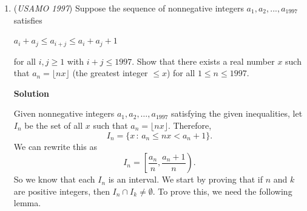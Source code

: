 \begin{enumerate}
 $\textbf{WARNING:}$

 This solution doesn’t work because $(x+y+z)\left(\frac{1}{x}+\frac{1}{y}+\frac{1}{z}\right)\geq 9$, so $\frac{1}{x}+\frac{1}{y}+\frac{1}{z}\geq \frac{9}{x+y+z}$




\textbf{Solution 3}

If we multiply each side by $abc$, we get that we must just prove that 
 \[\frac{abc}{a^3+b^3+abc} + \frac{abc}{b^3+c^3+abc} + \frac{abc}{c^3+a^3+abc} \leq 1\] If we divide our LHS equation, we get that 
 \[\frac{1}{\frac{a^3+b^3+abc}{abc}} +\frac{1}{\frac{b^3+c^3+abc}{abc}} + \frac{1}{\frac{c^3+a^3+abc}{abc}}\] 
 \[= \frac{1}{\frac{a^2}{bc} + \frac{b^2}{ac} + 1} +\frac{1}{\frac{b^2}{ac} + \frac{c^2}{ab} + 1}  + \frac{1}{\frac{c^2}{ab} + \frac{a^2}{bc} + 1}\] Make the astute observation that by Titu's Lemma, 
 \[\frac{a^2}{bc} + \frac{b^2}{ac} \geq \frac{\left(a+b\right)^2}{bc+ ac}\] 
 \[\sum_{cyc}\frac{\left(a+b\right)^2}{bc+ ac} \leq \sum_{cyc}\frac{a^2}{bc} + \frac{b^2}{ac}\] Therefore: 
 \[\sum_{cyc} \frac{1}{\frac{\left(a+b\right)^2}{c\left(a+b\right)  }+1} \geq \sum_{cyc} \frac{1}{\frac{a^2}{bc} + \frac{b^2}{ac} + 1}\] If we expand it out, we get that 
 \[\sum_{cyc} \frac{1}{\frac{\left(a+b\right)^2}{c\left(a+b\right)  }+1}  = \frac{a+b+c}{a+b+c} = 1\] Since our original equation is less than this, we get that 
 \[\sum_{cyc} \frac{1}{\frac{a^2}{bc} + \frac{b^2}{ac} + 1} \leq 1\] 
 \[\sum_{cyc} \frac{abc}{a^3+b^3+abc}\leq 1\] 
 \[\sum_{cyc} \frac{1}{a^3+b^3+abc} \leq \frac{1}{abc}\]

 -KEVIN\_LIU

 


	\item (\textit{USAMO 1997}) Suppose the sequence of nonnegative integers $a_1,a_2,...,a_{1997}$ satisfies 


 $a_i+a_j \le a_{i+j} \le a_i+a_j+1$


 for all $i, j \ge 1$ with $i+j \le 1997$. Show that there exists a real number $x$ such that $a_n=\lfloor{nx}\rfloor$ (the greatest integer $\le x$) for all $1 \le n \le 1997$.


 



\textbf{Solution}

Given nonnegative integers $a_1,a_2,\dots, a_{1997}$ satisfying the given inequalities, let $I_n$ be the set of all $x$ such that $a_n=\lfloor nx\rfloor$. Therefore,
 \[I_n=\{x\,:\,a_n\le nx<a_n+1\}.\]We can rewrite this as
 \[I_n=\left[\frac{a_n}{n},\frac{a_n+1}{n}\right).\tag{1}\]So we know that each $I_n$ is an interval. We start by proving that if $n$ and $k$ are positive integers, then $I_n\cap I_{k}\ne \emptyset$. To prove this, we need the following lemma.


\end{enumerate}
